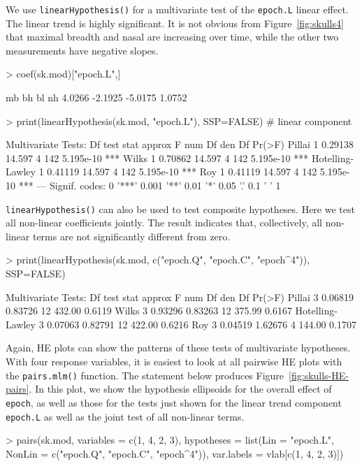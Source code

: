 \documentclass[11pt]{article}
\newcommand{\figref}[1]{Figure~\ref{#1}}
\newcommand{\code}[1]{{\texttt{#1}}}
\newcommand{\func}[1]{{\texttt{#1()}}}
\begin{document}
We use \func{linearHypothesis} for a multivariate test of the
\code{epoch.L} linear effect.
The linear trend is highly significant.  It is not obvious from 
\figref{fig:skulls4} that maximal breadth and nasal are increasing
over time, while the other two measurements have negative slopes.
\begin{Schunk}
\begin{Sinput}
> coef(sk.mod)["epoch.L",]
\end{Sinput}
\begin{Soutput}
     mb      bh      bl      nh 
 4.0266 -2.1925 -5.0175  1.0752 
\end{Soutput}
\begin{Sinput}
> print(linearHypothesis(sk.mod, "epoch.L"), SSP=FALSE) # linear component
\end{Sinput}
\begin{Soutput}
Multivariate Tests: 
                 Df test stat approx F num Df den Df    Pr(>F)    
Pillai            1   0.29138   14.597      4    142 5.195e-10 ***
Wilks             1   0.70862   14.597      4    142 5.195e-10 ***
Hotelling-Lawley  1   0.41119   14.597      4    142 5.195e-10 ***
Roy               1   0.41119   14.597      4    142 5.195e-10 ***
---
Signif. codes:  0 '***' 0.001 '**' 0.01 '*' 0.05 '.' 0.1 ' ' 1 
\end{Soutput}
\end{Schunk}
\func{linearHypothesis} can also be used to test composite hypotheses.
Here we test all non-linear coefficients jointly.  The result indicates
that, collectively, all non-linear terms are not significantly different
from zero.
\begin{Schunk}
\begin{Sinput}
> print(linearHypothesis(sk.mod, c("epoch.Q", "epoch.C", "epoch^4")), SSP=FALSE)
\end{Sinput}
\begin{Soutput}
Multivariate Tests: 
                 Df test stat approx F num Df den Df Pr(>F)
Pillai            3   0.06819  0.83726     12 432.00 0.6119
Wilks             3   0.93296  0.83263     12 375.99 0.6167
Hotelling-Lawley  3   0.07063  0.82791     12 422.00 0.6216
Roy               3   0.04519  1.62676      4 144.00 0.1707
\end{Soutput}
\end{Schunk}

Again, HE plots can show the patterns of these tests of multivariate hypotheses.
With four response variables, it is easiest to look at all pairwise
HE plots with the \func{pairs.mlm} function. 
The statement below produces \figref{fig:skulls-HE-pairs}.
In this plot, we show the hypothesis ellipsoids for the overall
effect of \code{epoch}, as well as those for the tests just shown
for the linear trend component \code{epoch.L}
as well as the joint test of all non-linear terms.
\begin{Schunk}
\begin{Sinput}
> pairs(sk.mod, variables = c(1, 4, 2, 3), hypotheses = list(Lin = "epoch.L", 
      NonLin = c("epoch.Q", "epoch.C", "epoch^4")), var.labels = vlab[c(1, 
      4, 2, 3)])
\end{Sinput}
\end{Schunk}
\end{document}
